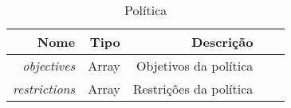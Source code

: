 \begin{table}[!htb]
    \centering
    \caption[Representação da política]{Política
    \label{tab:tabela-policy-entity}}
    \begin{tabular}{rrrrr}
        \toprule
            Nome & Tipo & Descrição \\ 
        \midrule
            \textit{objectives} & Array & Objetivos da política \\
            \textit{restrictions} & Array &  Restrições da política \\
        \bottomrule
    \end{tabular}
\end{table}
